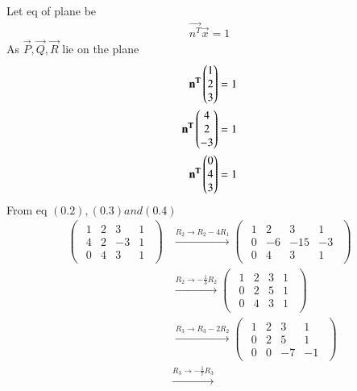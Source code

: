 \documentclass[journal]{IEEEtran}
\begin{document}
Let eq of plane be
\begin{align}
    \vec{n^T}\vec{x}=1
\end{align}
As $\vec{P},\vec{Q},\vec{R}$ lie on the plane
\begin{align}
 \mathbf{n^T}
 \begin{pmatrix}1
        \\
        2
        \\
        3
 \end{pmatrix}=1\\
  \mathbf{n^T}
 \begin{pmatrix}4
        \\
        2
        \\
        -3
 \end{pmatrix}=1\\
  \mathbf{n^T}
 \begin{pmatrix}0
        \\
        4
        \\
        3
 \end{pmatrix}=1
 \end{align}
From eq $(0.2),(0.3) and (0.4)$
\begin{align}
\begin{pmatrix}
\begin{array}{ccc|c}
1 & 2 & 3 & 1\\
4 & 2 & -3 & 1\\
0 & 4 & 3 & 1
\end{array}
\end{pmatrix}
&\xrightarrow{R_2 \to R_2 - 4R_1}
\begin{pmatrix}
\begin{array}{ccc|c}
1 & 2 & 3 & 1\\
0 & -6 & -15 & -3\\
0 & 4 & 3 & 1
\end{array}
\end{pmatrix} \\[4pt]
&\xrightarrow{R_2 \to -\tfrac{1}{3}R_2}
\begin{pmatrix}
\begin{array}{ccc|c}
1 & 2 & 3 & 1\\
0 & 2 & 5 & 1\\
0 & 4 & 3 & 1
\end{array}
\end{pmatrix} \\[4pt]
&\xrightarrow{R_3 \to R_3 - 2R_2}
\begin{pmatrix}
\begin{array}{ccc|c}
1 & 2 & 3 & 1\\
0 & 2 & 5 & 1\\
0 & 0 & -7 & -1
\end{array}
\end{pmatrix} \\[4pt]
&\xrightarrow{R_3 \to -\tfrac{1}{7}R_3}

\end{align}
\end{document}
